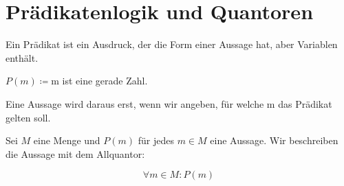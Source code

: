 \chapter{Prädikatenlogik und Quantoren}
Ein Prädikat ist ein Ausdruck, der die Form einer Aussage hat, aber Variablen enthält.

$P(m)\coloneqq$\glqq m ist eine gerade Zahl. \grqq

\noindent
Eine Aussage wird daraus erst, wenn wir angeben, für welche m das Prädikat gelten soll.

Sei $M$ eine Menge und $P(m)$ für jedes $m\in M$ eine Aussage. Wir beschreiben die Aussage mit dem Allquantor:

\begin{equation}
  \forall m\in M: P(m)
\end{equation}
